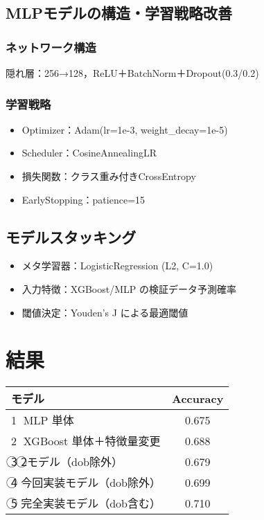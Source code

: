 \documentclass[a4paper,11pt]{article}
\newcommand{\circled}[1]{\textcircled{\scriptsize #1}}
\begin{document}
\subsection{MLPモデルの構造・学習戦略改善}
\subsubsection{ネットワーク構造}
隠れ層：256→128，ReLU＋BatchNorm＋Dropout(0.3/0.2)

\subsubsection{学習戦略}
\begin{itemize}[nosep]
  \item Optimizer：Adam(lr=1e-3, weight\_decay=1e-5)
  \item Scheduler：CosineAnnealingLR
  \item 損失関数：クラス重み付きCrossEntropy
  \item EarlyStopping：patience=15
\end{itemize}

\subsection{モデルスタッキング}
\begin{itemize}[nosep]
  \item メタ学習器：LogisticRegression (L2, C=1.0)
  \item 入力特徴：XGBoost/MLP の検証データ予測確率
  \item 閾値決定：Youden's J による最適閾値
\end{itemize}

\section{結果}
\begin{table}[htbp]
  \centering
  \begin{tabular}{lc}
    \toprule
    モデル & Accuracy \\
    \midrule
    \circled{1} MLP 単体 & 0.675 \\
    \circled{2} XGBoost 単体＋特徴量変更 & 0.688 \\
    \circled{3} \circled{2}モデル（dob除外） & 0.679 \\
    \circled{4} 今回実装モデル（dob除外） & 0.699 \\
    \circled{5} 完全実装モデル（dob含む） & 0.710 \\
    \bottomrule
  \end{tabular}
\end{table}
\end{document}
